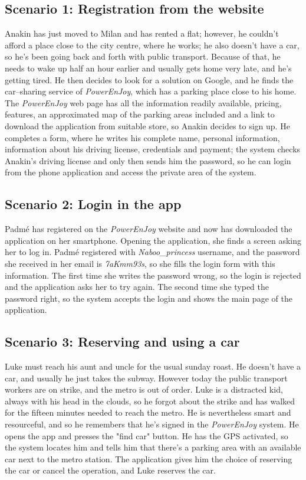\subsection{Scenario 1: Registration from the website}
	Anakin has just moved to Milan and has rented a flat; however, he couldn't afford a place close to the city centre, where he works; he also doesn't have a car, so he's been going back and forth with public transport. Because of that, he needs to wake up half an hour earlier and usually gets home very late, and he's getting tired. He then decides to look for a solution on Google, and he finds the car–sharing service of \textit{PowerEnJoy}, which has a parking place close to his home. The \textit{PowerEnJoy} web page has all the information readily available, pricing, features, an approximated map of the parking areas included and a link to download the application from suitable store, so Anakin decides to sign up. He completes a form, where he writes his complete name, personal information, information about his driving license, credentials and payment; the system checks Anakin's driving license and only then sends him the password, so he can login from the phone application and access the private area of the system. 
		
\subsection{Scenario 2: Login in the app} %
	Padmé has registered on the \textit{PowerEnJoy} website and now has downloaded the application on her smartphone. Opening the application, she finds a screen asking her to log in. Padmé registered with \textit{Naboo\_princess} username, and the password she received in her email is \textit{7aKmm93s}, so she fills the login form with this information. The first time she writes the password wrong, so the login is rejected and the application asks her to try again. The second time she typed the password right, so the system accepts the login and shows the main page of the application.
	
\subsection{Scenario 3: Reserving and using a car}
	Luke must reach his aunt and uncle for the usual sunday roast. He doesn't have a car, and usually he just takes the subway. However today the public transport workers are on strike, and the metro is out of order. Luke is a distracted kid, always with his head in the clouds, so he forgot about the strike and has walked for the fifteen minutes needed to reach the metro. He is nevertheless smart and resourceful, and so he remembers that he's signed in the \textit{PowerEnJoy} system. He opens the app and presses the "find car" button. He has the GPS activated, so the system locates him and tells him that there's a parking area with an available car next to the metro station. The application gives him the choice of reserving the car or cancel the operation, and Luke reserves the car. 
	
